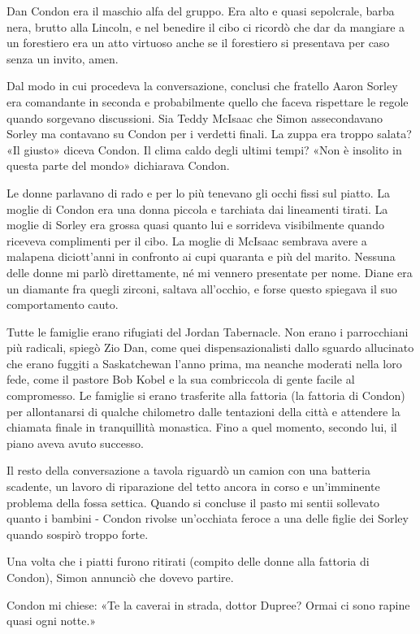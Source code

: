 Dan Condon era il maschio alfa del gruppo. Era alto e quasi sepolcrale,
barba nera, brutto alla Lincoln, e nel benedire il cibo ci ricordò che
dar da mangiare a un forestiero era un atto virtuoso anche se il
forestiero si presentava per caso senza un invito, amen.

Dal modo in cui procedeva la conversazione, conclusi che fratello Aaron
Sorley era comandante in seconda e probabilmente quello che faceva
rispettare le regole quando sorgevano discussioni. Sia Teddy McIsaac che
Simon assecondavano Sorley ma contavano su Condon per i verdetti finali.
La zuppa era troppo salata? «Il giusto» diceva Condon. Il clima caldo
degli ultimi tempi? «Non è insolito in questa parte del mondo»
dichiarava Condon.

Le donne parlavano di rado e per lo più tenevano gli occhi fissi sul
piatto. La moglie di Condon era una donna piccola e tarchiata dai
lineamenti tirati. La moglie di Sorley era grossa quasi quanto lui e
sorrideva visibilmente quando riceveva complimenti per il cibo. La
moglie di McIsaac sembrava avere a malapena diciott'anni in confronto ai
cupi quaranta e più del marito. Nessuna delle donne mi parlò
direttamente, né mi vennero presentate per nome. Diane era un diamante
fra quegli zirconi, saltava all'occhio, e forse questo spiegava il suo
comportamento cauto.

Tutte le famiglie erano rifugiati del Jordan Tabernacle. Non erano i
parrocchiani più radicali, spiegò Zio Dan, come quei dispensazionalisti
dallo sguardo allucinato che erano fuggiti a Saskatchewan l'anno prima,
ma neanche moderati nella loro fede, come il pastore Bob Kobel e la sua
combriccola di gente facile al compromesso. Le famiglie si erano
trasferite alla fattoria (la fattoria di Condon) per allontanarsi di
qualche chilometro dalle tentazioni della città e attendere la chiamata
finale in tranquillità monastica. Fino a quel momento, secondo lui, il
piano aveva avuto successo.

Il resto della conversazione a tavola riguardò un camion con una
batteria scadente, un lavoro di riparazione del tetto ancora in corso e
un'imminente problema della fossa settica. Quando si concluse il pasto
mi sentii sollevato quanto i bambini - Condon rivolse un'occhiata feroce
a una delle figlie dei Sorley quando sospirò troppo forte.

Una volta che i piatti furono ritirati (compito delle donne alla
fattoria di Condon), Simon annunciò che dovevo partire.

Condon mi chiese: «Te la caverai in strada, dottor Dupree? Ormai ci sono
rapine quasi ogni notte.»

